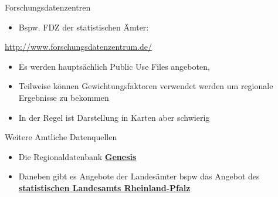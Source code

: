 \documentclass[ignorenonframetext,]{beamer}
\providecommand{\tightlist}{%
  \setlength{\itemsep}{0pt}\setlength{\parskip}{0pt}}
\begin{document}
\begin{frame}{Forschungsdatenzentren}
\protect\hypertarget{forschungsdatenzentren}{}

\begin{itemize}
\tightlist
\item
  Bspw. FDZ der statistischen Ämter:
\end{itemize}

\url{http://www.forschungsdatenzentrum.de/}

\begin{itemize}
\item
  Es werden hauptsächlich Public Use Files angeboten,
\item
  Teilweise können Gewichtungsfaktoren verwendet werden um regionale
  Ergebnisse zu bekommen
\item
  In der Regel ist Darstellung in Karten aber schwierig
\end{itemize}

\end{frame}

\begin{frame}{Weitere Amtliche Datenquellen}
\protect\hypertarget{weitere-amtliche-datenquellen}{}

\begin{itemize}
\item
  Die Regionaldatenbank
  \href{https://www-genesis.destatis.de/genesis/online}{\textbf{Genesis}}
\item
  Daneben gibt es Angebote der Landesämter bspw das Angebot des
  \href{https://www.statistik.rlp.de/regionaldaten/}{\textbf{statistischen
  Landesamts Rheinland-Pfalz}}
\end{itemize}

\end{frame}
\end{document}
